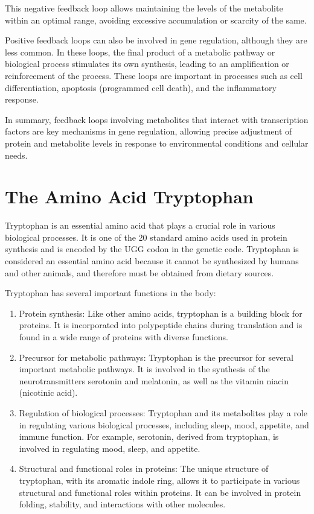 This negative feedback loop allows maintaining the levels of the metabolite within an optimal range, avoiding excessive accumulation or scarcity of the same.

Positive feedback loops can also be involved in gene regulation, although they are less common. In these loops, the final product of a metabolic pathway or biological process stimulates its own synthesis, leading to an amplification or reinforcement of the process. These loops are important in processes such as cell differentiation, apoptosis (programmed cell death), and the inflammatory response.

In summary, feedback loops involving metabolites that interact with transcription factors are key mechanisms in gene regulation, allowing precise adjustment of protein and metabolite levels in response to environmental conditions and cellular needs.

\section{The Amino Acid Tryptophan}

Tryptophan is an essential amino acid that plays a crucial role in various biological processes. It is one of the 20 standard amino acids used in protein synthesis and is encoded by the UGG codon in the genetic code. Tryptophan is considered an essential amino acid because it cannot be synthesized by humans and other animals, and therefore must be obtained from dietary sources.

Tryptophan has several important functions in the body:
\begin{enumerate}
    \item Protein synthesis: Like other amino acids, tryptophan is a building block for proteins. It is incorporated into polypeptide chains during translation and is found in a wide range of proteins with diverse functions.
    \item Precursor for metabolic pathways: Tryptophan is the precursor for several important metabolic pathways. It is involved in the synthesis of the neurotransmitters serotonin and melatonin, as well as the vitamin niacin (nicotinic acid).
    \item Regulation of biological processes: Tryptophan and its metabolites play a role in regulating various biological processes, including sleep, mood, appetite, and immune function. For example, serotonin, derived from tryptophan, is involved in regulating mood, sleep, and appetite.
    \item Structural and functional roles in proteins: The unique structure of tryptophan, with its aromatic indole ring, allows it to participate in various structural and functional roles within proteins. It can be involved in protein folding, stability, and interactions with other molecules.
\end{enumerate}

